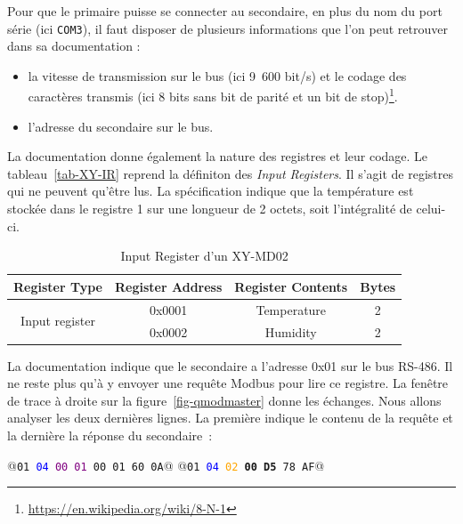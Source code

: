 \documentclass[11pt,fleqn]{book} %
\begin{document}
Pour que le primaire puisse se connecter au secondaire, en plus du nom du port série (ici \texttt{COM3}), il faut disposer de plusieurs informations que l'on peut retrouver dans sa documentation :

\begin{itemize}
    \item la vitesse de transmission sur le bus (ici 9~600 bit/s) et le codage des caractères transmis (ici 8 bits sans bit de parité et un bit de stop)\footnote{\url{https://en.wikipedia.org/wiki/8-N-1}}.
    \item l'adresse du secondaire sur le bus.
\end{itemize}

    \vspace{1em}

La documentation donne également la nature des registres et leur codage. Le tableau~\vref{tab-XY-IR} reprend la définiton des \textit{Input Registers}. Il s'agit de registres qui ne peuvent qu'être lus. La spécification indique que la température est stockée dans le registre 1 sur une longueur de 2 octets, soit l'intégralité de celui-ci.

\begin{table}
\begin{center}
\begin{tabular}{|c|c|c|c|}
\hline
 \rowcolor{purple!10} Register Type & Register Address & Register Contents & Bytes \\ \hline \hline
 \multirow{2}{*}{Input register} & 0x0001 & Temperature & 2 \\ \cline{2-4}
                                 & 0x0002 & Humidity & 2 \\  \hline
\end{tabular}
\end{center}
\caption{Input Register d'un XY-MD02}
\label{tab-XY-IR}
\end{table}

    \vspace{1em}

La documentation indique que le secondaire a l'adresse 0x01 sur le bus RS-486. Il ne reste plus qu'à y envoyer une requête Modbus pour lire ce registre. La fenêtre de trace à droite sur la figure~\vref{fig-qmodmaster} donne les échanges. Nous allons analyser les deux dernières lignes. La première indique le contenu de la requête et la dernière la réponse du secondaire~:

\begin{termc}[backgroundcolor=\color{backcolour}, escapechar=@]
@\texttt{01 \textcolor{blue}{04} \textcolor{purple}{00 01} \textcolor{green!60!black}{00 01} \textcolor{black!30}{60 0A}}@
@\texttt{01 \textcolor{blue}{04} \textcolor{orange}{02} \textbf{00 D5} \textcolor{black!30}{78 AF}}@
\end{termc}
\end{document}

